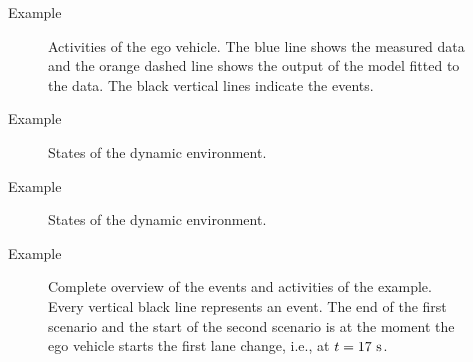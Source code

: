 \documentclass[aspectratio=\AspectR,10pt,compress,t]{beamer} %
\newlength\figurewidth
\newlength\figureheight
\begin{document}
\begin{frame}{Example}
	\vspace{-1em}
	\begin{figure}
		\centering
		\setlength\figureheight{150pt}
		\setlength\figurewidth{248pt}
		
		\caption{Activities of the ego vehicle. The blue line shows the measured data and the orange dashed line shows the output of the model fitted to the data. The black vertical lines indicate the events.}
	\end{figure}
\end{frame}

\begin{frame}{Example}
	\vspace{-1em}
	\begin{figure}
		\centering
		\setlength\figureheight{150pt}
		\setlength\figurewidth{248pt}
		
		\caption{States of the dynamic environment.}
	\end{figure}
\end{frame}

\begin{frame}{Example}
	\vspace{-1em}
	\begin{figure}
		\centering
		\setlength\figureheight{150pt}
		\setlength\figurewidth{248pt}
		
		\caption{States of the dynamic environment.}
	\end{figure}
\end{frame}

\begin{frame}{Example}
	\vspace{-1em}
	\begin{figure}
		\centering
		\setlength\figureheight{160pt}
		\setlength\figurewidth{450pt}
		
		\vspace{-1em}
		\caption{Complete overview of the events and activities of the example. Every vertical black line represents an event. The end of the first scenario and the start of the second scenario is at the moment the ego vehicle starts the first lane change, i.e., at $t=17\ \textup{s}$.}
	\end{figure}
\end{frame}
\end{document}
